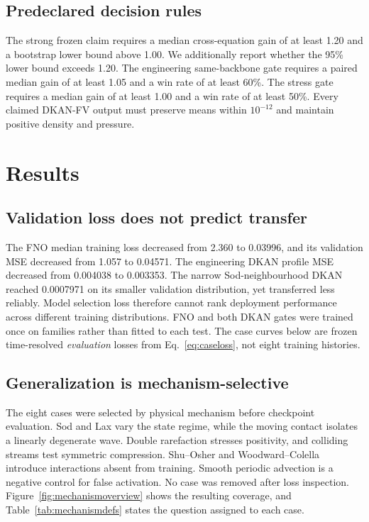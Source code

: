 \documentclass[10pt,twocolumn]{article}
\begin{document}
\subsection{Predeclared decision rules}

The strong frozen claim requires a median cross-equation gain of at least 1.20 and a bootstrap lower bound above 1.00. We additionally report whether the 95\% lower bound exceeds 1.20. The engineering same-backbone gate requires a paired median gain of at least 1.05 and a win rate of at least 60\%. The stress gate requires a median gain of at least 1.00 and a win rate of at least 50\%. Every claimed DKAN-FV output must preserve means within $10^{-12}$ and maintain positive density and pressure.

\section{Results}

\subsection{Validation loss does not predict transfer}

The FNO median training loss decreased from 2.360 to 0.03996, and its validation MSE decreased from 1.057 to 0.04571. The engineering DKAN profile MSE decreased from 0.004038 to 0.003353. The narrow Sod-neighbourhood DKAN reached 0.0007971 on its smaller validation distribution, yet transferred less reliably. Model selection loss therefore cannot rank deployment performance across different training distributions. FNO and both DKAN gates were trained once on families rather than fitted to each test. The case curves below are frozen time-resolved \emph{evaluation} losses from Eq.~\eqref{eq:caseloss}, not eight training histories.

\subsection{Generalization is mechanism-selective}

The eight cases were selected by physical mechanism before checkpoint evaluation. Sod and Lax vary the state regime, while the moving contact isolates a linearly degenerate wave. Double rarefaction stresses positivity, and colliding streams test symmetric compression. Shu--Osher and Woodward--Colella introduce interactions absent from training. Smooth periodic advection is a negative control for false activation. No case was removed after loss inspection. Figure~\ref{fig:mechanismoverview} shows the resulting coverage, and Table~\ref{tab:mechanismdefs} states the question assigned to each case.
\end{document}
